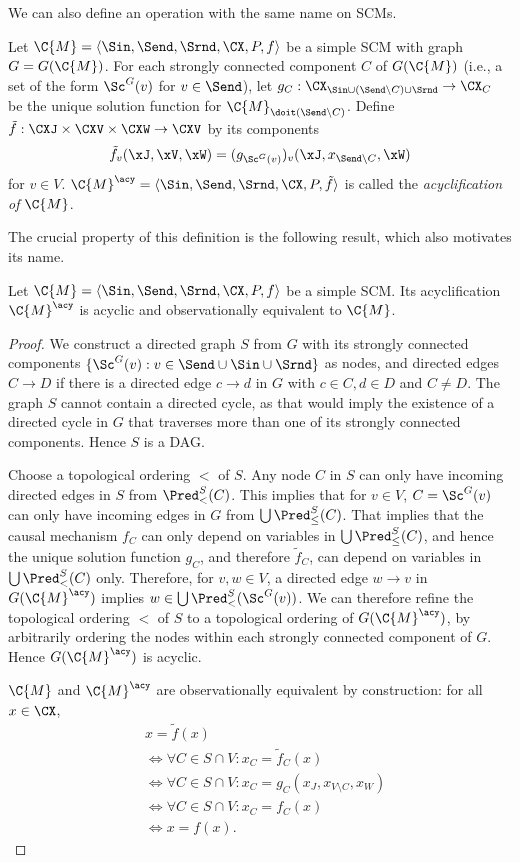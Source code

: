 We can also define an operation with the same name on SCMs.
\begin{Def}\label{def:scm_acyclification}
  Let $\C{M} = \langle \Sin, \Send, \Srnd, \CX, P, f \rangle$ be a simple SCM with graph $G = G(\C{M})$.
  For each strongly connected component $C$ of $G(\C{M})$ (i.e., a set of the form
  $\Sc^G(v)$ for $v \in \Send$), let 
  $g_C : \CX_{\Sin \cup (\Send \setminus C) \cup \Srnd} \to \CX_C$
  be the unique solution function for $\C{M}_{\doit(\Send \setminus C)}$.
  Define $\tilde{f} : \CXJ \times \CXV \times \CXW \to \CXV$ by its components
  $$\tilde{f}_v(\xJ,\xV,\xW) = (g_{\Sc^G(v)})_v(\xJ,x_{\Send\setminus C},\xW)$$
  for $v \in V$.
  $\C{M}^\acy = \langle \Sin, \Send, \Srnd, \CX, P, \tilde{f} \rangle$ is called the
  \emph{acyclification of $\C{M}$}.
\end{Def}
The crucial property of this definition is the following result, which also motivates its name.
\begin{Prp}\label{prp:scm_acyclification_properties}
  Let $\C{M} = \langle \Sin, \Send, \Srnd, \CX, P, f \rangle$ be a simple SCM. Its acyclification $\C{M}^\acy$ is
  acyclic and observationally equivalent to $\C{M}$.
\end{Prp}
\begin{proof}
  We construct a directed graph $S$ from $G$ with its strongly connected components $\{\Sc^G(v) : v \in \Send \cup \Sin \cup \Srnd\}$
  as nodes, and directed edges
  $C \to D$ if there is a directed edge $c \to d$ in $G$ with $c \in C, d \in D$ and $C \ne D$.
  The graph $S$ cannot contain a directed cycle, as that would imply the existence of a directed
  cycle in $G$ that traverses more than one of its strongly connected components. Hence $S$ is a DAG.
  
  Choose a topological ordering $<$ of $S$.
  Any node $C$ in $S$ can only have incoming directed edges
  in $S$ from $\Pred^S_<(C)$. This implies that for $v \in V$, $C = \Sc^G(v)$ can only have incoming
  edges in $G$ from $\bigcup \Pred^S_\le(C)$. That implies that the causal mechanism $f_C$
  can only depend on variables in $\bigcup \Pred^S_\le(C)$, and hence
  the unique solution function $g_C$, and therefore $\tilde{f}_C$, can depend on variables in $\bigcup \Pred^S_<(C)$ only.
  Therefore, for $v,w \in V$, a directed edge $w \to v$ in $G(\C{M}^\acy)$ implies 
  $w \in \bigcup \Pred^S_<(\Sc^G(v))$. We can therefore refine the topological ordering $<$ of $S$ 
  to a topological ordering of $G(\C{M}^\acy)$, by arbitrarily ordering the nodes within each strongly connected component
  of $G$. Hence $G(\C{M}^\acy)$ is acyclic.

  $\C{M}$ and $\C{M}^\acy$ are observationally equivalent by construction: for all $x \in \CX$,
  \begin{align*}
  & x = \tilde{f}(x) \\
  & \iff \forall C \in S \cap V: x_C = \tilde{f}_C(x) \\
  & \iff \forall C \in S \cap V: x_C = g_C(x_J,x_{V\setminus C},x_W) \\
  & \iff \forall C \in S \cap V: x_C = f_C(x) \\
  & \iff x = f(x).
  \end{align*}
\end{proof}
